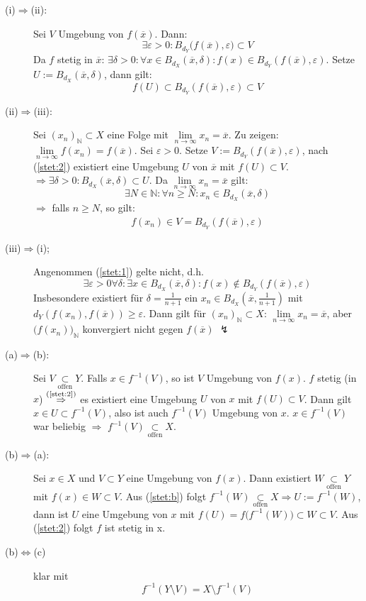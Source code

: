 \begin{description}
	\item[(i)$\Rightarrow$(ii):] Sei $V$ Umgebung von $f(\overline{x})$. Dann: 
	\[
		\exists \varepsilon >0 : B_{d_Y} \big( f(\overline{x}) , \varepsilon\big) \subset V
	\]
	Da $f$ stetig in $\overline{x}$: $\exists \delta >0 : \forall x \in B_{d_X} ( \overline{x}, \delta  ) : f(x) \in B_{d_Y}(f(\overline{x}), \varepsilon)$.
	Setze $U:= B_{d_X} ( \overline{x}, \delta)$, dann gilt:
	\[
		f(U) \subset B_{d_Y} ( f(\overline{x}), \varepsilon) \subset V \tag*{$\square$}
	\]
	\item[(ii)$\Rightarrow$(iii):] Sei $(x_n)_\mathds{N} \subset X$ eine Folge mit $\lim\limits_{ n \to \infty} x_n = \overline{x} $. Zu zeigen: 
	$\lim\limits_{ n \to \infty} f(x_n) = f(\overline{x})$. Sei $\varepsilon >0$. Setze $V:= B_{d_Y}( f(\overline{x}), \varepsilon)$, nach (\ref{stet:2}) existiert
	eine Umgebung $U$ von $\overline{x}$ mit $f(U) \subset V$. $\Rightarrow \exists \delta  >0 : B_{d_X} ( \overline{x}, \delta ) \subset U$. Da 
	$\lim\limits_{ n \to \infty}  x_n = \overline{x} $ gilt: 
	\[
		\exists N \in \mathds{N} : \forall n \ge N : x_n \in B_{d_X} ( \overline{x}, \delta)
	\]
	$\Rightarrow$ falls $n \ge N$, so gilt: 
	\begin{align*}
		f(x_n) \in V = B_{d_Y} ( f(\overline{x}), \varepsilon) \tag*{$\square$}
	\end{align*}
	\item[(iii)$\Rightarrow$(i);] Angenommen (\ref{stet:1}) gelte nicht, d.h.
	\[
		\exists \varepsilon >0 \forall \delta : \exists x \in B_{d_X}(\overline{x}, \delta ) : f(x) \not\in B_{d_Y} (f(\overline{x}), \varepsilon)
	\]
	Insbesondere existiert für $\delta = \frac{1}{n+1} $ ein $x_n \in B_{d_X}( \overline{x}, \frac{1}{n+1} )$ mit $d_Y(f(x_n), f(\overline{x})) \ge \varepsilon$.
	Dann gilt für $(x_n)_\mathds{N} \subset X$: $\lim\limits_{ n \to \infty} x_n = \overline{x}$, aber $\big(f(x_n)\big)_{\mathds{N}}$ konvergiert nicht gegen 
	$f(\overline{x})$ {\large $\lightning$}
	\item[(a)$\Rightarrow$(b):] Sei $V \underset{\text{offen}}{\subset} Y$. Falls $x \in f^{-1} (V)$, so ist $V$ Umgebung von $f(x)$. $f$ stetig (in $x$) 
	$\overset{\text{(\ref{stet:2})}}{\Rightarrow}$ es existiert eine Umgebung $U$ von $x$ mit $f(U) \subset V$. Dann gilt $x \in U  \subset f^{-1}(V)$, also ist auch 
	$f ^{-1}(V)$ Umgebung von $x$. $x \in f ^{-1}(V)$ war beliebig $\Rightarrow$ $f ^{-1}(V) \underset{\text{offen}}{\subset} X$. \bewende
	\item[(b)$\Rightarrow$(a):] Sei $x \in X$ und $V \subset Y$ eine Umgebung von $f(x)$. Dann existiert $W \underset{\text{offen}}{\subset} Y$ mit 
	$f(x) \in W  \subset V$. Aus (\ref{stet:b}) folgt $f ^{-1} (W) \underset{\text{offen}}{\subset} X \Rightarrow U := f ^{-1} (W)$, dann ist $U$ eine Umgebung von $x$
	mit $f(U)= f \big( f ^{-1} (W) \big) \subset W \subset V$. Aus (\ref{stet:2}) folgt $f$ ist stetig in x.
	\item[(b)$\Leftrightarrow$(c)] klar mit 
	\[
		f ^{-1} ( Y \setminus V) = X \setminus f ^{-1} (V)
	\]
\end{description}

